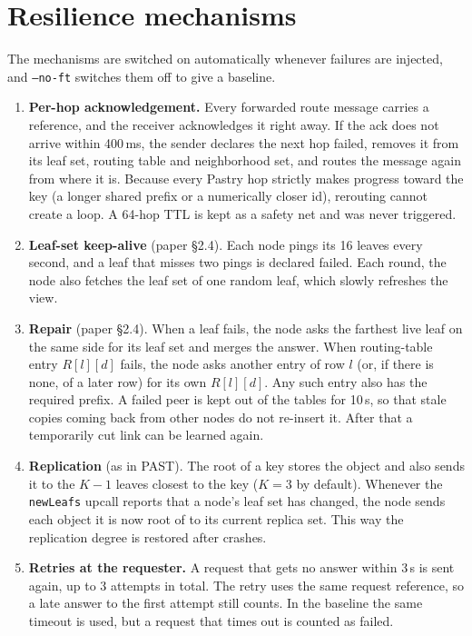 \documentclass[10pt]{article}
\begin{document}
\section{Resilience mechanisms}
The mechanisms are switched on automatically whenever failures are injected, and \texttt{--no-ft} switches them off to give a baseline.
\begin{enumerate}
  \item \textbf{Per-hop acknowledgement.} Every forwarded route message carries a reference, and the receiver acknowledges it right away.
  If the ack does not arrive within 400\,ms, the sender declares the next hop failed, removes it from its leaf set, routing table and neighborhood set, and routes the message again from where it is.
  Because every Pastry hop strictly makes progress toward the key (a longer shared prefix or a numerically closer id), rerouting cannot create a loop. A 64-hop TTL is kept as a safety net and was never triggered.
  \item \textbf{Leaf-set keep-alive} (paper \S2.4). Each node pings its 16 leaves every second, and a leaf that misses two pings is declared failed.
  Each round, the node also fetches the leaf set of one random leaf, which slowly refreshes the view.
  \item \textbf{Repair} (paper \S2.4). When a leaf fails, the node asks the farthest live leaf on the same side for its leaf set and merges the answer.
  When routing-table entry $R[l][d]$ fails, the node asks another entry of row $l$ (or, if there is none, of a later row) for its own $R[l][d]$. Any such entry also has the required prefix.
  A failed peer is kept out of the tables for 10\,s, so that stale copies coming back from other nodes do not re-insert it. After that a temporarily cut link can be learned again.
  \item \textbf{Replication} (as in PAST). The root of a key stores the object and also sends it to the $K-1$ leaves closest to the key ($K=3$ by default).
  Whenever the \texttt{newLeafs} upcall reports that a node's leaf set has changed, the node sends each object it is now root of to its current replica set.
  This way the replication degree is restored after crashes.
  \item \textbf{Retries at the requester.} A request that gets no answer within 3\,s is sent again, up to 3 attempts in total.
  The retry uses the same request reference, so a late answer to the first attempt still counts.
  In the baseline the same timeout is used, but a request that times out is counted as failed.
\end{enumerate}
\end{document}
